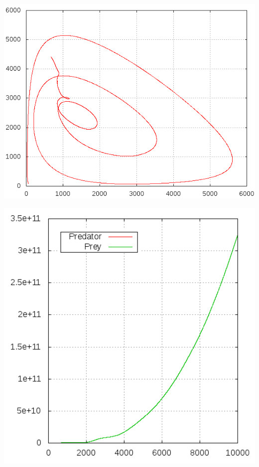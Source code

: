 \documentclass[11pt]{article}
\begin{document}
\begin{minipage}[b]{0.5\textwidth}
\includegraphics[width=1.0\textwidth]{Graphiken/ppm45ham.png}
\end{minipage}
\begin{minipage}[b]{0.48\textwidth}
\includegraphics[width=1.0\textwidth]{Graphiken/ppm45abb.png}
\end{minipage}
\end{document}
